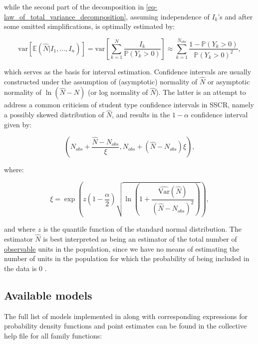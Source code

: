 \documentclass[
]{jss}
\newcommand{\1}{\mathcal{I}} \newcommand{\bZero}{\boldsymbol{0}}
\begin{document}
while the second part of the decomposition in
\eqref{eq-law_of_total_variance_decomposition}, assuming independence of
\(I_{k}\)'s and after some omitted simplifications, is optimally
estimated by:

\begin{equation*}
  \text{var}\left[\mathbb{E}(\hat{N}|I_{1},\dots,I_{n})\right] =
  \text{var}\left[\sum_{k=1}^{N}\frac{I_{k}}{\mathbb{P}(Y_{k}>0)}\right]
  \approx\sum_{k=1}^{N_{obs}}\frac{1-\mathbb{P}(Y_{k}>0)}{\mathbb{P}(Y_{k}>0)^{2}},
\end{equation*}

which serves as the basis for interval estimation. Confidence intervals
are usually constructed under the assumption of (asymptotic) normality
of \(\hat{N}\) or asymptotic normality of \(\ln(\hat{N}-N)\) (or log
normality of \(\hat{N}\)). The latter is an attempt to address a common
criticism of student type confidence intervals in SSCR, namely a
possibly skewed distribution of \(\hat{N}\), and results in the
\(1-\alpha\) confidence interval given by:

\begin{equation*}
  \left(N_{obs}+\frac{\hat{N}-N_{obs}}{\xi},N_{obs} +
  \left(\hat{N}-N_{obs}\right)\xi\right),
\end{equation*}

where:

\begin{equation*}
  \xi = \exp\left(z\left(1-\frac{\alpha}{2}\right)
  \sqrt{\ln\left(1+\frac{\widehat{\text{Var}}(\hat{N})}{\left(\hat{N}-N_{obs}\right)^{2}}\right)}\right),
\end{equation*}

and where \(z\) is the quantile function of the standard normal
distribution. The estimator \(\hat{N}\) is best interpreted as being an
estimator of the total number of \underline{observable} units in the
population, since we have no means of estimating the number of units in
the population for which the probability of being included in the data
is \(0\) \citep[cf.][]{ztpoisson}.

\subsection{Available models}\label{available-models}

The full list of models implemented in  along with
corresponding expressions for probability density functions and point
estimates can be found in the collective help file for all family
functions:
\end{document}
